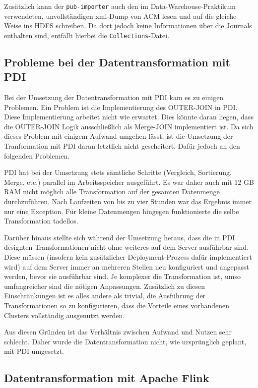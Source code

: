 \documentclass[a4paper,11pt,utf8]{scrartcl}
\begin{document}
Zusätzlich kann der \texttt{pub-importer} auch den im Data-Warehouse-Praktikum verwendeten, unvollständigen xml-Dump von ACM lesen und auf die gleiche Weise ins HDFS schreiben. Da dort jedoch keine Informationen über die Journals enthalten sind, entfällt hierbei die \texttt{Collections}-Datei.

\subsection{Probleme bei der Datentransformation mit PDI}

Bei der Umsetzung der Datentransformation mit PDI kam es zu einigen Problemen. Ein Problem ist die Implementierung des OUTER-JOIN in PDI. Diese Implementierung arbeitet nicht wie erwartet. Dies könnte daran liegen, dass die OUTER-JOIN Logik ausschließlich als Merge-JOIN implementiert ist. Da sich dieses Problem mit einigem Aufwand umgehen lässt, ist die Umsetzung der Tranformation mit PDI daran letztlich nicht gescheitert. Dafür jedoch an den folgenden Problemen.

PDI hat bei der Umsetzung stets sämtliche Schritte (Vergleich, Sortierung, Merge, etc.) parallel im Arbeitsspeicher ausgeführt. Es war daher auch mit 12 GB RAM nicht möglich alle Transformation auf der gesamten Datenmenge durchzuführen. Nach Laufzeiten von bis zu vier Stunden war das Ergebnis immer nur eine Exception. Für kleine Datenmengen hingegen funktionierte die selbe Transformation tadellos.

Darüber hinaus stellte sich während der Umsetzung heraus, dass die in PDI designten Transformationen nicht ohne weiteres auf dem Server ausführbar sind. Diese müssen (insofern kein zusätzlicher Deployment-Prozess dafür implementiert wird) auf dem Server immer an mehreren Stellen neu konfiguriert und angepasst werden, bevor sie ausführbar sind. Je komplexer die Transformation ist, umso umfangreicher sind die nötigen Anpassungen. Zusätzlich zu diesen Einschränkungen ist es alles andere als trivial, die Ausführung der Transformationen so zu konfigurieren, dass die Vorteile eines vorhandenen Clusters vollständig ausgenutzt werden.

Aus diesen Gründen ist das Verhältnis zwischen Aufwand und Nutzen sehr schlecht. Daher wurde die Datentransformation nicht, wie ursprünglich geplant, mit PDI umgesetzt.

\subsection{Datentransformation mit Apache Flink}
\end{document}
